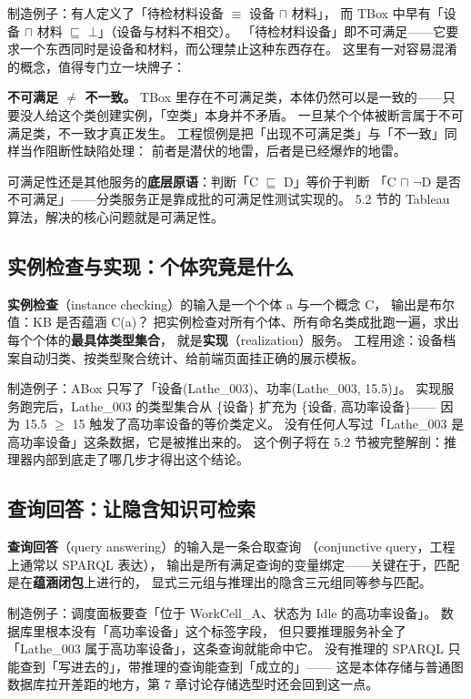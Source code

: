 制造例子：有人定义了「待检材料设备 \(\equiv\) 设备 \(\sqcap\) 材料」，
而 TBox 中早有「设备 \(\sqcap\) 材料 \(\sqsubseteq\) \(\bot\)」（设备与材料不相交）。
「待检材料设备」即不可满足——它要求一个东西同时是设备和材料，而公理禁止这种东西存在。
这里有一对容易混淆的概念，值得专门立一块牌子：

\begin{noteblock}
\textbf{不可满足 \(\ne\) 不一致。}
TBox 里存在不可满足类，本体仍然可以是一致的——只要没人给这个类创建实例，「空类」本身并不矛盾。
一旦某个个体被断言属于不可满足类，不一致才真正发生。
工程惯例是把「出现不可满足类」与「不一致」同样当作阻断性缺陷处理：
前者是潜伏的地雷，后者是已经爆炸的地雷。
\end{noteblock}

可满足性还是其他服务的\textbf{底层原语}：判断「C \(\sqsubseteq\) D」等价于判断
「C \(\sqcap\) \(\lnot\)D 是否不可满足」——分类服务正是靠成批的可满足性测试实现的。
5.2 节的 Tableau 算法，解决的核心问题就是可满足性。

\subsection{实例检查与实现：个体究竟是什么}

\textbf{实例检查}（instance checking）的输入是一个个体 a 与一个概念 C，
输出是布尔值：KB 是否蕴涵 C(a)？
把实例检查对所有个体、所有命名类成批跑一遍，求出每个个体的\textbf{最具体类型集合}，
就是\textbf{实现}（realization）服务。
工程用途：设备档案自动归类、按类型聚合统计、给前端页面挂正确的展示模板。

制造例子：ABox 只写了「设备(Lathe\_003)、功率(Lathe\_003, 15.5)」。
实现服务跑完后，Lathe\_003 的类型集合从 \{设备\} 扩充为 \{设备, 高功率设备\}——
因为 15.5 \(\ge\) 15 触发了高功率设备的等价类定义。
没有任何人写过「Lathe\_003 是高功率设备」这条数据，它是被推出来的。
这个例子将在 5.2 节被完整解剖：推理器内部到底走了哪几步才得出这个结论。

\subsection{查询回答：让隐含知识可检索}

\textbf{查询回答}（query answering）的输入是一条合取查询
（conjunctive query，工程上通常以 SPARQL 表达），
输出是所有满足查询的变量绑定——关键在于，匹配是在\textbf{蕴涵闭包}上进行的，
显式三元组与推理出的隐含三元组同等参与匹配。

制造例子：调度面板要查「位于 WorkCell\_A、状态为 Idle 的高功率设备」。
数据库里根本没有「高功率设备」这个标签字段，
但只要推理服务补全了「Lathe\_003 属于高功率设备」，这条查询就能命中它。
没有推理的 SPARQL 只能查到「写进去的」，带推理的查询能查到「成立的」——
这是本体存储与普通图数据库拉开差距的地方，第 7 章讨论存储选型时还会回到这一点。

